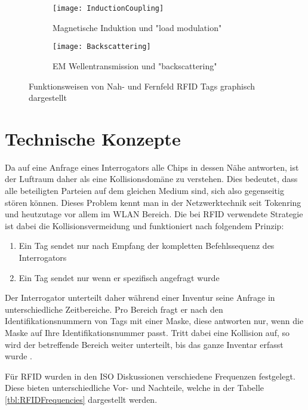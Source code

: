 \begin{figure}[htb]
	\centering
	\begin{subfigure}[b]{0.8\linewidth}
		\centering
		\texttt{[image: InductionCoupling]}
		\caption{Magnetische Induktion und "load modulation"}
	\end{subfigure}
	\begin{subfigure}[b]{0.8\linewidth}
		\centering
		\texttt{[image: Backscattering]}
		\caption{EM Wellentransmission und "backscattering"}
	\end{subfigure}
	\caption{Funktionsweisen von Nah- und Fernfeld \gls{RFID} Tags graphisch dargestellt \parencite{want2006}}
\end{figure}

\section{Technische Konzepte}
\label{sec:technischeKonzepte}

Da auf eine Anfrage eines Interrogators alle Chips in dessen Nähe antworten, ist der Luft\-raum daher als eine Kollisionsdomäne zu verstehen. Dies bedeutet, dass alle beteiligten Parteien auf dem gleichen Medium sind, sich also gegenseitig stören können. Dieses Problem kennt man in der Netzwerktechnik seit Tokenring und heutzutage vor allem im WLAN Bereich. Die bei \gls{RFID} verwendete Strategie ist dabei die Kollisionsvermeidung und funktioniert nach folgendem Prinzip:
\begin{enumerate}
	\item Ein Tag sendet nur nach Empfang der kompletten Befehlssequenz des Interrogators
	\item Ein Tag sendet nur wenn er spezifisch angefragt wurde
\end{enumerate}
Der Interrogator unterteilt daher während einer Inventur seine Anfrage in unterschiedliche Zeitbereiche. Pro Bereich fragt er nach den Identifikationsnummern von Tags mit einer Maske, diese antworten nur, wenn die Maske auf Ihre Identifikationsnummer passt. Tritt dabei eine Kollision auf, so wird der betreffende Bereich weiter unterteilt, bis das ganze Inventar erfasst wurde \parencite{ISO15693-3}.

Für \gls{RFID} wurden in den ISO Diskussionen verschiedene Frequenzen festgelegt. Diese bieten unterschiedliche Vor- und Nachteile, welche in der Tabelle \ref{tbl:RFIDFrequencies} dargestellt werden.

